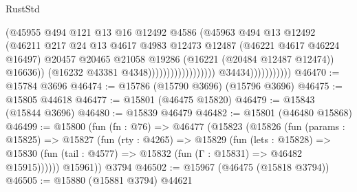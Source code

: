 \begin{lexlean}{RustStd}
\begin{coremodule}
                                                          (@45955
                                                            @494
                                                            @121
                                                            @13
                                                            @16
                                                            @12492
                                                            @4586
                                                            (@45963
                                                              @494
                                                              @13
                                                              @12492
                                                              (@46211
                                                                @217
                                                                @24
                                                                @13
                                                                @4617
                                                                @4983
                                                                @12473
                                                                @12487
                                                                (@46221 @4617 @46224 @16497)
                                                                @20457
                                                                @20465
                                                                @21058
                                                                @19286
                                                                (@16221 (@20484 @12487 @12474))
                                                                @16636))
                                                            (@16232 @43381 @4348))))))))))))))))))
                          @34434)))))))))))
@46470 := @15784 @3696
@46474 := @15786 (@15790 @3696) (@15796 @3696)
@46475 := @15805 @44618
@46477 := @15801 (@46475 @15820)
@46479 := @15843 (@15844 @3696)
@46480 := @15839 @46479
@46482 := @15801 (@46480 @15868)
@46499 := @15800
    (fun (fn : @76) =>
    @46477
      (@15823
        (@15826
          (fun (params : @15825) =>
          @15827
            (fun (rty : @4265) =>
            @15829
              (fun (lets : @15828) =>
              @15830 (fun (tail : @4577) => @15832 (fun (Γ : @15831) => @46482 @15915))))))
        @15961))
    @3794
@46502 := @15967 (@46475 (@15818 @3794))
@46505 := @15880 (@15881 @3794) @44621

\end{coremodule}
\end{lexlean}
